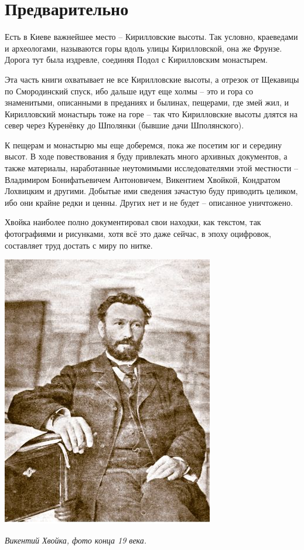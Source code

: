 \chapter{Предварительно}

Есть в Киеве важнейшее место – Кирилловские высоты. Так условно, краеведами и археологами, называются горы вдоль улицы Кирилловской, она же Фрунзе. Дорога тут была издревле, соединяя Подол с Кирилловским монастырем.

Эта часть книги охватывает не все Кирилловские высоты, а отрезок от Щекавицы по Смородинский спуск, ибо дальше идут еще холмы – это и гора со знаменитыми, описанными в преданиях и былинах, пещерами, где змей жил, и Кирилловский монастырь тоже на горе – так что Кирилловские высоты длятся на север через Куренёвку до Шполянки (бывшие дачи Шполянского).

К пещерам и монастырю мы еще доберемся, пока же посетим юг и середину высот. В ходе повествования я буду привлекать много архивных документов, а также материалы, наработанные неутомимыми исследователями этой местности – Владимиром Бонифатьевичем Антоновичем, Викентием Хвойкой, Кондратом Лохвицким и другими. Добытые ими сведения зачастую буду приводить целиком, ибо они крайне редки и ценны. Других нет и не будет – описанное уничтожено.

Хвойка наиболее полно документировал свои находки, как текстом, так фотографиями и рисунками, хотя всё это даже сейчас, в эпоху оцифровок, составляет труд достать с миру по нитке.

\begin{center}
\includegraphics[width=0.68\linewidth]{chast-kirvys/predvaritelno/hvoyka-9x.png}

\textit{Викентий Хвойка, фото конца 19 века.}
\end{center}

